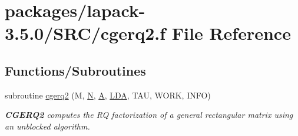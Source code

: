 \hypertarget{cgerq2_8f}{}\section{packages/lapack-\/3.5.0/\+S\+R\+C/cgerq2.f File Reference}
\label{cgerq2_8f}
\subsection*{Functions/\+Subroutines}
\begin{DoxyCompactItemize}
\item 
subroutine \hyperlink{group__complexGEcomputational_ga6e2b93235b0ed01d7ddb3fa293e9c45d}{cgerq2} (M, \hyperlink{polmisc_8c_a0240ac851181b84ac374872dc5434ee4}{N}, \hyperlink{classA}{A}, \hyperlink{example__user_8c_ae946da542ce0db94dced19b2ecefd1aa}{L\+D\+A}, T\+A\+U, W\+O\+R\+K, I\+N\+F\+O)
\begin{DoxyCompactList}\small\item\em {\bfseries C\+G\+E\+R\+Q2} computes the R\+Q factorization of a general rectangular matrix using an unblocked algorithm. \end{DoxyCompactList}\end{DoxyCompactItemize}
